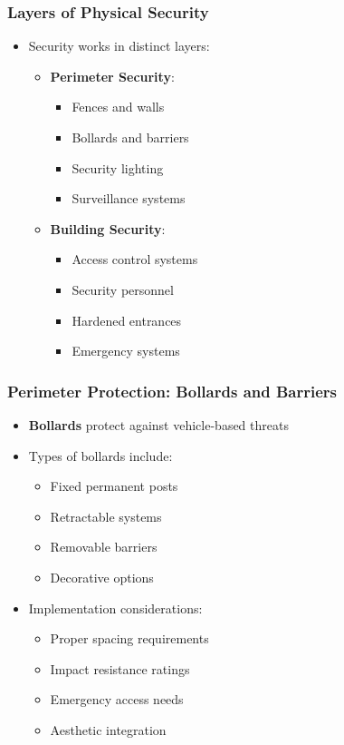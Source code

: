\documentclass{beamer}
\begin{document}
\begin{frame}
    \frametitle{Layers of Physical Security}
    \begin{itemize}
        \item Security works in distinct layers:
          \begin{itemize}
            \item \textbf{Perimeter Security}:
              \begin{itemize}
                \item Fences and walls
                \item Bollards and barriers
                \item Security lighting
                \item Surveillance systems
              \end{itemize}
            \item \textbf{Building Security}:
              \begin{itemize}
                \item Access control systems
                \item Security personnel
                \item Hardened entrances
                \item Emergency systems
              \end{itemize}
          \end{itemize}
    \end{itemize}
\end{frame}

\begin{frame}
    \frametitle{Perimeter Protection: Bollards and Barriers}
    \begin{itemize}
        \item \textbf{Bollards} protect against vehicle-based threats
        \item Types of bollards include:
          \begin{itemize}
            \item Fixed permanent posts
            \item Retractable systems
            \item Removable barriers
            \item Decorative options
          \end{itemize}
        \item Implementation considerations:
          \begin{itemize}
            \item Proper spacing requirements
            \item Impact resistance ratings
            \item Emergency access needs
            \item Aesthetic integration
          \end{itemize}
    \end{itemize}
\end{frame}
\end{document}
